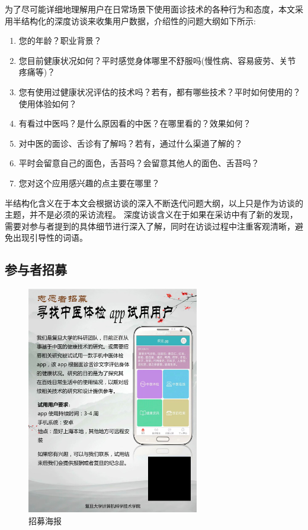 为了尽可能详细地理解用户在日常场景下使用面诊技术的各种行为和态度，本文采用半结构化的深度访谈来收集用户数据\cite{DiciccoThe}，介绍性的问题大纲如下所示:
\begin{enumerate}
    \item 您的年龄？职业背景？
    \item 您目前健康状况如何？平时感觉身体哪里不舒服吗(慢性病、容易疲劳、关节疼痛等)？
    \item 您有使用过健康状况评估的技术吗？若有，都有哪些技术？平时如何使用的？使用体验如何？
    \item 有看过中医吗？是什么原因看的中医？在哪里看的？效果如何？
    \item 对中医的面诊、舌诊有了解吗？若有，通过什么渠道了解的？
    \item 平时会留意自己的面色，舌苔吗？会留意其他人的面色、舌苔吗？
    \item 您对这个应用感兴趣的点主要在哪里？
\end{enumerate}

半结构化含义在于本文会根据访谈的深入不断迭代问题大纲，以上只是作为访谈的主题，并不是必须的采访流程。
深度访谈含义在于如果在采访中有了新的发现，需要对参与者提到的具体细节进行深入了解，同时在访谈过程中注重客观清晰，避免出现引导性的词语。

\subsection{参与者招募}
\begin{figure}[ht]
    \centering
    \includegraphics[height=10cm]{images/poster.png}
    \caption{招募海报}
    \label{fig:poster}
\end{figure}

